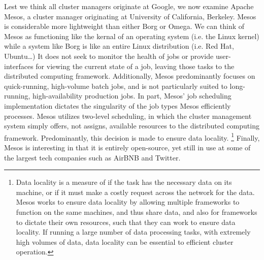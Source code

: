 Lest we think all cluster managers originate at Google, we now examine Apache
Mesos, a cluster manager originating at University of California, Berkeley.
Mesos is considerable more lightweight than either Borg or Omega.
We can think of Mesos as functioning like the kernal of an operating system
(i.e. the Linux kernel) while a system like Borg is like an entire Linux
distribution (i.e. Red Hat, Ubuntu\ldots)
It does not seek to monitor the health of jobs or provide user-interfaces for viewing the
current state of a job, leaving those tasks to the distributed computing
framework. Additionally, Mesos predominantly focuses on quick-running,
high-volume batch jobs, and is not particularly suited to long-running,
high-availability production jobs.\cite[pg. 358]{omega} In part, Mesos'
job scheduling implementation dictates the singularity of the job types
Mesos efficiently processes. Mesos utilizes two-level scheduling, in which the
cluster management system simply offers, not assigns, available
resources to the distributed computing framework. Predominantly, this decision
is made to ensure data locality.\cite[pg. 1]{mesos} \footnote{Data locality is a measure
of if the task has the necessary data on its machine, or if it must make a
costly request across the network for the data. Mesos works to ensure data
locality by allowing multiple frameworks to function on the same machines, and
thus share data, and also for frameworks to dictate their own resources, such
that they can work to ensure data locality. If running a large number of data
processing tasks, with extremely high volumes of data, data locality can be
essential to efficient cluster operation.} Finally, Mesos is interesting in
that it is entirely open-source, yet still in use at some of the largest tech
companies such as AirBNB and Twitter.\cite{return-of-the-borg}
